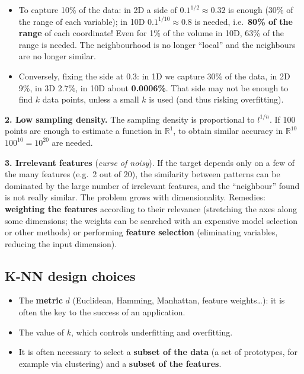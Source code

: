 \begin{itemize}
\tightlist
\item
  To capture 10\% of the data: in 2D a side of
  \(0.1^{1/2} \approx 0.32\) is enough (30\% of the range of each
  variable); in 10D \(0.1^{1/10} \approx 0.8\) is needed, i.e.\
  \textbf{80\% of the range} of each coordinate! Even for 1\% of the
  volume in 10D, 63\% of the range is needed. The neighbourhood is no
  longer ``local'' and the neighbours are no longer similar.
\item
  Conversely, fixing the side at 0.3: in 1D we capture 30\% of the
  data, in 2D 9\%, in 3D 2.7\%, in 10D about \textbf{0.0006\%}. That
  side may not be enough to find \(k\) data points, unless a small
  \(k\) is used (and thus risking overfitting).
\end{itemize}

\textbf{2. Low sampling density.} The sampling density is proportional
to \(l^{1/n}\). If 100 points are enough to estimate a function in
\(\mathbb{R}^1\), to obtain similar accuracy in \(\mathbb{R}^{10}\)
\(100^{10} = 10^{20}\) are needed.

\textbf{3. Irrelevant features} (\emph{curse of noisy}). If the target
depends only on a few of the many features (e.g.\ 2 out of 20), the
similarity between patterns can be dominated by the large number of
irrelevant features, and the ``neighbour'' found is not really
similar. The problem grows with dimensionality. Remedies:
\textbf{weighting the features} according to their relevance
(stretching the axes along some dimensions; the weights can be searched
with an expensive model selection or other methods) or performing
\textbf{feature selection} (eliminating variables, reducing the input
dimension).

\subsection{K-NN design
choices}\label{scelte-di-progetto-del-k-nn}

\begin{itemize}
\tightlist
\item
  The \textbf{metric} \(d\) (Euclidean, Hamming, Manhattan, feature
  weights\ldots): it is often the key to the success of an
  application.
\item
  The value of \textbf{\(k\)}, which controls underfitting and
  overfitting.
\item
  It is often necessary to select a \textbf{subset of the data} (a set
  of prototypes, for example via clustering) and a \textbf{subset of
  the features}.
\end{itemize}

